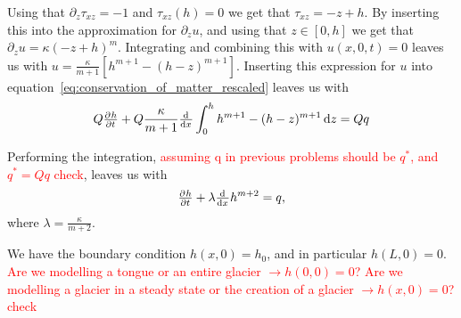 Using that $\partial_{z}\tau_{xz} = -1$ and $\tau_{xz}(h) = 0$ we get that $\tau_{xz} = -z + h$. By inserting this into the approximation for $\partial_{z}u$, and using that $z \in \left[0, h\right]$ we get that $\partial_{z}u = \kappa(-z + h)^{m}$. Integrating and combining this with $u(x, 0, t) = 0$ leaves us with $u = \frac{\kappa}{m+1}\left[h^{m+1} - (h - z)^{m+1}\right]$. Inserting this expression for $u$ into equation~\eqref{eq:conservation_of_matter_rescaled} leaves us with 
%
\begin{equation}
    Q \pd{{h}}{{t}} + Q\frac{\kappa}{m+1}\od{}{{x}}\int_0^h h^{m+1} - (h - z)^{m+1} \dif{z} = Qq
\end{equation}

Performing the integration, \textcolor{red}{assuming q in previous problems should be $q^*$, and $q^* = Qq$ check}, leaves us with
%
\begin{equation}\label{eq:rescaled_conservation_of_matter}
    \pd{{h}}{{t}} + \lambda \od{}{{x}}h^{m+2} = q,
\end{equation}
%
where $\lambda = \frac{\kappa}{m+2}$.

We have the boundary condition $h(x,0) = h_0$, and in particular $h(L, 0) = 0$. \textcolor{red}{Are we modelling a tongue or an entire glacier $\rightarrow h(0, 0) = 0$? Are we modelling a glacier in a steady state or the creation of a glacier $\rightarrow h(x, 0) = 0$? check}
